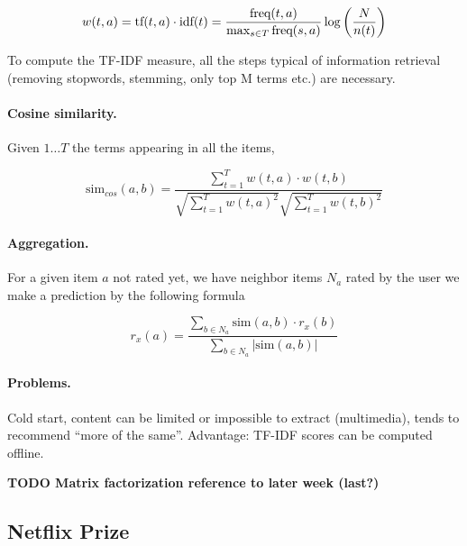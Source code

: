 \[
  w(t,a) = \text{tf}(t,a) \cdot \text{idf}(t) = \frac{\text{freq}(t,a)}{\max_{s\in T} \text{freq}(s,a)}\log\left(\frac{N}{n(t)}\right)
\]

To compute the TF-IDF measure, all the steps typical of information retrieval (removing stopwords, stemming, only top M terms etc.) are necessary.

\paragraph{Cosine similarity.} Given $1 \dots T$ the terms appearing in all the items,

\[
  \text{sim}_{cos}(a,b) = \frac {\sum_{t=1}^T w(t,a)\cdot w(t,b)}{\sqrt{\sum_{t=1}^T w(t,a)^2}\sqrt{\sum_{t=1}^T w(t,b)^2}}
\]

\paragraph{Aggregation.} For a given item $a$ not rated yet, we have neighbor items $N_a$ rated by the user we make a prediction by the following formula

\[
  r_x(a) = \frac {\sum_{b\in N_a} \text{sim}(a,b) \cdot r_x(b)}{\sum_{b\in N_a} | \text{sim}(a,b)|}
\]

\paragraph{Problems.} Cold start, content can be limited or impossible to extract (multimedia), tends to recommend “more of the same”. Advantage: TF-IDF scores can be computed offline.

\textbf{TODO Matrix factorization reference to later week (last?)}

\subsection{Netflix Prize}

